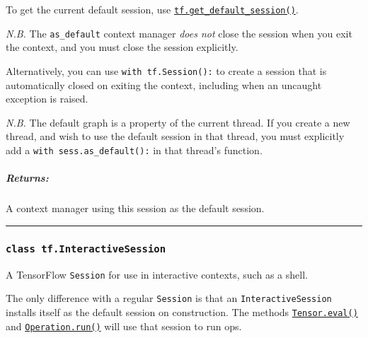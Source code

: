 To get the current default session, use
\protect\hyperlink{getux5fdefaultux5fsession}{\texttt{tf.get\_default\_session()}}.

\emph{N.B.} The \texttt{as\_default} context manager \emph{does not}
close the session when you exit the context, and you must close the
session explicitly.

\begin{Shaded}
\begin{Highlighting}[]
\OperatorTok{=} 
\OperatorTok{=} 
 
   \NormalTok{()}
 
   \NormalTok{()}

\end{Highlighting}
\end{Shaded}

Alternatively, you can use \texttt{with\ tf.Session():} to create a
session that is automatically closed on exiting the context, including
when an uncaught exception is raised.

\emph{N.B.} The default graph is a property of the current thread. If
you create a new thread, and wish to use the default session in that
thread, you must explicitly add a \texttt{with\ sess.as\_default():} in
that thread's function.

\subparagraph{Returns: }\label{returns-1}

A context manager using this session as the default session.

\begin{center}\rule{0.5\linewidth}{\linethickness}\end{center}

\subsubsection{\texorpdfstring{\texttt{class\ tf.InteractiveSession}
}{class tf.InteractiveSession }}\label{class-tf.interactivesession}

A TensorFlow \texttt{Session} for use in interactive contexts, such as a
shell.

The only difference with a regular \texttt{Session} is that an
\texttt{InteractiveSession} installs itself as the default session on
construction. The methods
\href{../../api_docs/python/framework.md\#Tensor.eval}{\texttt{Tensor.eval()}}
and
\href{../../api_docs/python/framework.md\#Operation.run}{\texttt{Operation.run()}}
will use that session to run ops.

